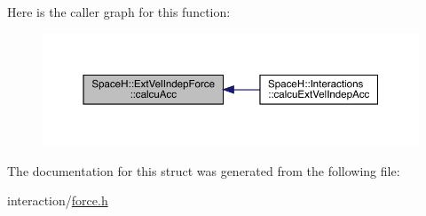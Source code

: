 Here is the caller graph for this function\+:
\nopagebreak
\begin{figure}[H]
\begin{center}
\leavevmode
\includegraphics[width=350pt]{struct_space_h_1_1_ext_vel_indep_force_ade2a9eececdb0833213048c1e73c7756_icgraph}
\end{center}
\end{figure}


The documentation for this struct was generated from the following file\+:\begin{DoxyCompactItemize}
\item 
interaction/\mbox{\hyperlink{force_8h}{force.\+h}}\end{DoxyCompactItemize}
